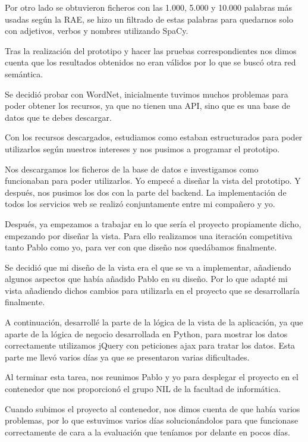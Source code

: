 Por otro lado se obtuvieron ficheros con las 1.000, 5.000 y 10.000 palabras más usadas según la RAE, se hizo un filtrado de estas palabras para quedarnos solo con adjetivos, verbos y nombres utilizando SpaCy.

Tras la realización del prototipo y hacer las pruebas correspondientes nos dimos cuenta que los resultados obtenidos no eran válidos por lo que se buscó otra red semántica.

Se decidió probar con WordNet, inicialmente tuvimos muchos problemas para poder obtener los recursos, ya que no tienen una API, sino que es una base de datos que te debes descargar.


Con los recursos descargados, estudiamos como estaban estructurados para poder utilizarlos según nuestros intereses y nos pusimos a programar el prototipo.

Nos descargamos los ficheros de la base de datos e investigamos como funcionaban para poder utilizarlos. Yo empecé a diseñar la vista del prototipo. Y después, nos pusimos los dos con la parte del backend.
La implementación de todos los servicios web se realizó conjuntamente entre mi compañero y yo.


Después, ya empezamos a trabajar en lo que sería el proyecto propiamente dicho, empezando por diseñar la vista. Para ello realizamos una iteración competitiva tanto Pablo como yo, para ver con que diseño nos quedábamos finalmente.

Se decidió que mi diseño de la vista era el que se va a implementar, añadiendo algunos aspectos que había añadido Pablo en su diseño. Por lo que adapté mi vista añadiendo dichos cambios para utilizarla en el proyecto que se desarrollaría finalmente.

A continuación, desarrollé la parte de la lógica de la vista de la aplicación, ya que aparte de la lógica de negocio desarrollada en Python, para mostrar los datos correctamente utilizamos jQuery con peticiones ajax para tratar los datos. Esta parte me llevó varios días ya que se presentaron varias dificultades.

Al terminar esta tarea, nos reunimos Pablo y yo para desplegar el proyecto en el contenedor que nos proporcionó el grupo NIL de la facultad de informática. 

Cuando subimos el proyecto al contenedor, nos dimos cuenta de que  había varios problemas, por lo que estuvimos varios días solucionándolos para que funcionase correctamente de cara a la evaluación que teníamos por delante en pocos días.

